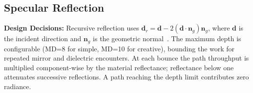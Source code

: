 \documentclass[11pt,a4paper]{article}
\begin{document}
\subsection{Specular Reflection}
\textbf{Design Decisions:} Recursive reflection uses \( \mathbf{d}_r = \mathbf{d} - 2(\mathbf{d} \cdot \mathbf{n}_g)\mathbf{n}_g \), where \(\mathbf{d}\) is the incident direction and \(\mathbf{n}_g\) is the geometric normal~\cite[Ch.~8, p.~26]{shirley2018}. The maximum depth is configurable (MD=8 for simple, MD=10 for creative), bounding the work for repeated mirror and dielectric encounters. At each bounce the path throughput is multiplied component-wise by the material reflectance; reflectance below one attenuates successive reflections. A path reaching the depth limit contributes zero radiance.
\end{document}
